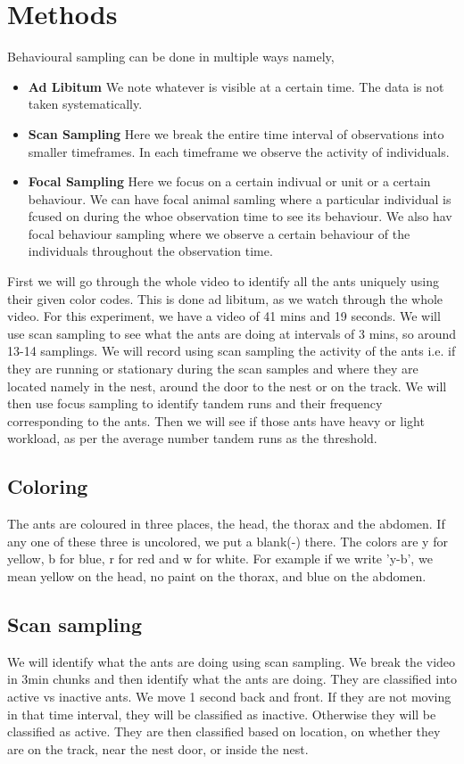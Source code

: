 \documentclass{scrartcl}
\begin{document}
\section{Methods}\label{meth}
Behavioural sampling can be done in multiple ways namely,
\begin{itemize}
    \item \textbf{Ad Libitum} We note whatever is visible at a certain time. The data is not taken systematically.
    \item \textbf{Scan Sampling} Here we break the entire time interval of observations into smaller timeframes. In each timeframe we observe the activity of individuals.
    \item \textbf{Focal Sampling} Here we focus on a certain indivual or unit or a certain behaviour. We can have focal animal samling where a particular individual is fcused on during the whoe observation time to see its behaviour. We also hav focal behaviour sampling where we observe a certain behaviour of the individuals throughout the observation time.
\end{itemize}
First we will go through the whole video to identify all the ants uniquely using their given color codes. This is
done ad libitum, as we watch through the whole video.
For this experiment, we have a video of 41 mins and 19 seconds. We will use scan sampling to see what 
the ants are doing at intervals of 3 mins, so around 13-14 samplings. We will record using scan sampling 
the activity of the ants i.e. if they are running or stationary during the scan samples and where they are 
located namely in the nest, around the door to the nest or on the track. 
We will then use focus sampling to identify tandem runs and their frequency corresponding to the ants.
Then we will see if those ants have heavy or light workload, as per the average number tandem runs as the 
threshold.
\subsection{Coloring}
The ants are coloured in three places, the head, the thorax and the abdomen. If any one of these three 
is uncolored, we put a blank(-) there. The colors are y for yellow, b for blue, r for red and w for white. 
For example if we write 'y-b', we mean yellow on the head, no paint on the thorax, and blue on the abdomen.
\subsection{Scan sampling}
We will identify what the ants are doing using scan sampling. We break the video in 3min chunks and 
then identify what the ants are doing. They are classified into active vs inactive ants. We move 
1 second back and front. If they are not moving in that time interval, they will be classified as inactive.
Otherwise they will be classified as active. They are then classified based on location, on whether 
they are on the track, near the nest door, or inside the nest.
\end{document}
